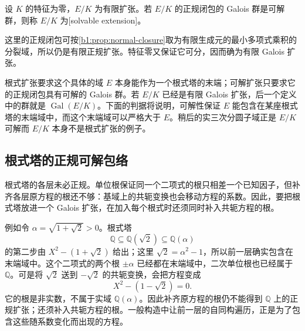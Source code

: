 \begin{definition}\label{b1:def:solvable-extension}
	设 \(K\) 的特征为零，\(E/K\) 为有限扩张。若 \(E/K\) 的正规闭包的 Galois 群是可解群，则称 \(E/K\) 为[solvable extension]。
\end{definition}

这里的正规闭包可按\cref{b1:prop:normal-closure}取为有限生成元的最小多项式乘积的分裂域，所以仍是有限正规扩张。特征零又保证它可分，因而确为有限 Galois 扩张。

\ProseParagraphBreak
根式扩张要求这个具体的域 \(E\) 本身能作为一个根式塔的末端；可解扩张只要求它的正规闭包具有可解的 Galois 群。若 \(E/K\) 已经是有限 Galois 扩张，后一个定义中的群就是 \(\operatorname{Gal}(E/K)\)。下面的判据将说明，可解性保证 \(E\) 能包含在某座根式塔的末端域中，而这个末端域可以严格大于 \(E\)。稍后的实三次分圆子域正是 \(E/K\) 可解而 \(E/K\) 本身不是根式扩张的例子。

\subsection{根式塔的正规可解包络}
\label{b1:subsec:2102:02}

根式塔的各层未必正规。单位根保证同一个二项式的根只相差一个已知因子，但补齐各层原方程的根还不够：基域上的共轭变换也会移动方程的系数。因此，要把根式塔放进一个 Galois 扩张，在加入每个根式时还须同时补入共轭方程的根。

\ProseParagraphBreak
例如令 \(\alpha=\sqrt{1+\sqrt2}>0\)。根式塔
\[
	\mathbb Q\subseteq\mathbb Q(\sqrt2)\subseteq\mathbb Q(\alpha)
\]
的第二步由 \(X^2-(1+\sqrt2)\) 给出；这里 \(\sqrt2=\alpha^2-1\)，所以前一层确实包含在末端域中。这个二项式的两个根 \(\pm\alpha\) 已经都在末端域中，二次单位根也已经属于 \(\mathbb Q\)。可是将 \(\sqrt2\) 送到 \(-\sqrt2\) 的共轭变换，会把方程变成
\[
	X^2-(1-\sqrt2)=0.
\]
它的根是非实数，不属于实域 \(\mathbb Q(\alpha)\)。因此补齐原方程的根仍不能得到 \(\mathbb Q\) 上的正规扩张；还须补入共轭方程的根。一般构造中让前一层的自同构遍历，正是为了包含这些随系数变化而出现的方程。

